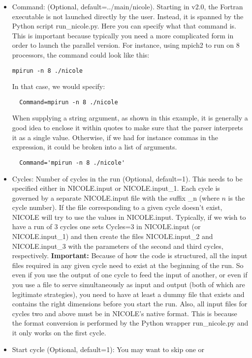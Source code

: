 \begin{itemize}
\item Command: (Optional, default=../main/nicole). Starting in v2.0, the
  Fortran executable is not launched directly by the user. Instead, it
  is spanned by the Python script run\_nicole.py. Here you can specify
  what that command is. This is important because typically you need a
  more complicated form in order to launch the parallel version. For
  instance, using mpich2 to run on 8 processors, the command could
  look like this:
\begin{verbatim}
mpirun -n 8 ./nicole
\end{verbatim}
  In that case, we would specify:
\begin{verbatim}
  Command=mpirun -n 8 ./nicole
\end{verbatim}
  When supplying a string argument, as shown in this example, it is
  generally a good idea to enclose it within quotes to make sure that
  the parser interprets it as a single value. Otherwise, if we had for
  instance commas in the expression, it could be broken into a list of
  arguments. 
\begin{verbatim}
  Command='mpirun -n 8 ./nicole'
\end{verbatim}
\item Cycles: Number of cycles in the run (Optional, default=1). This
  needs to be specified either in NICOLE.input or
  NICOLE.input\_1. Each cycle is governed by a separate NICOLE.input
  file with the suffix \_n (where $n$ is the cycle number). If the
  file corresponding to a given cycle doesn't exist, NICOLE will try
  to use the values in NICOLE.input. Typically, if we wish to have a
  run of 3 cycles one sets Cycles=3 in NICOLE.input (or
  NICOLE.input\_1) and then create the files NICOLE.input\_2 and
  NICOLE.input\_3 with the parameters of the second and third cycles,
  respectively. {\bf Important: }Because of how the code is
  structured, all the input files required in any given cycle need to
  exist at the beginning of the run. So even if you use the output of
  one cycle to feed the input of another, or even if you use a file to
  serve simultaneously as input and output (both of which are
  legitimate strategies), you need to have at least a dummy file that
  exists and contains the right dimensions before you start the run. Also,
  all input files for cycles two and above must be in NICOLE's native format.
  This is because the format conversion is performed by the Python wrapper
  run\_nicole.py and it only works on the first cycle. 
\item Start cycle (Optional, default=1): You may want to skip one or

\end{itemize}
